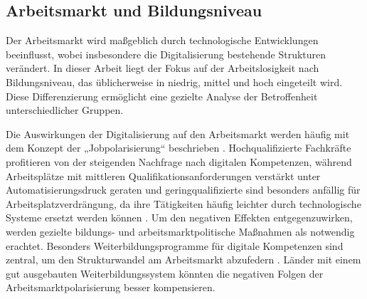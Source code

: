 
\subsection{Arbeitsmarkt und Bildungsniveau}

Der Arbeitsmarkt wird maßgeblich durch technologische Entwicklungen beeinflusst,
wobei insbesondere die Digitalisierung bestehende Strukturen verändert. In dieser
Arbeit liegt der Fokus auf der Arbeitslosigkeit nach Bildungsniveau, das üblicherweise
in niedrig, mittel und hoch eingeteilt wird. Diese Differenzierung ermöglicht eine 
gezielte Analyse der Betroffenheit unterschiedlicher Gruppen.

Die Auswirkungen der Digitalisierung auf den Arbeitsmarkt werden häufig mit dem
Konzept der „Jobpolarisierung“ beschrieben \parencite[vgl.][S. 12]{autor2015whyare}. 
Hochqualifizierte Fachkräfte profitieren von der steigenden Nachfrage nach digitalen 
Kompetenzen, während Arbeitsplätze mit mittleren Qualifikationsanforderungen verstärkt 
unter Automatisierungsdruck geraten und geringqualifizierte sind besonders anfällig 
für Arbeitsplatzverdrängung, da ihre Tätigkeiten häufig leichter durch technologische 
Systeme ersetzt werden können \parencite[vgl.][S. 10]{acemoglu2002technical}.
Um den negativen Effekten entgegenzuwirken, werden gezielte bildungs- und
arbeitsmarktpolitische Maßnahmen als notwendig erachtet. Besonders
Weiterbildungsprogramme für digitale Kompetenzen sind zentral, um den
Strukturwandel am Arbeitsmarkt abzufedern 
\parencite[vgl.][Kap. 13]{brynjolfsson2014thesecond}. Länder mit einem gut ausgebauten 
Weiterbildungssystem könnten die negativen Folgen der Arbeitsmarktpolarisierung besser 
kompensieren.
